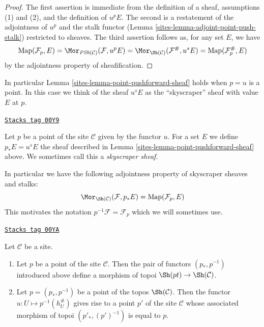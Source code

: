 \begin{proof}

The first assertion is immediate from the definition of a sheaf, assumptions
(1) and (2), and the definition of $u^pE$. The second is a restatement of the
adjointness of $u^p$ and the stalk functor
(Lemma \ref{sites-lemma-adjoint-point-push-stalk}) restricted to sheaves.
The third assertion follows as, for any set $E$, we have
$$
\text{Map}(\mathcal{F}_p, E) =
\Mor_{\textit{PSh}(\mathcal{C})}(\mathcal{F}, u^pE) =
\Mor_{\Sh(\mathcal{C})}(\mathcal{F}^\#, u^sE) =
\text{Map}(\mathcal{F}^\#_p, E)
$$
by the adjointness property of sheafification.
\end{proof}

In particular Lemma \ref{sites-lemma-point-pushforward-sheaf}
holds when $p = u$ is a point. In this case we think of the
sheaf $u^sE$ as the ``skyscraper'' sheaf with value $E$ at $p$.

\begin{definition}
\label{sites-definition-pushforward-point}
\href{https://stacks.math.columbia.edu/tag/00Y9}{\texttt{Stacks tag 00Y9}}

Let $p$ be a point of the site $\mathcal{C}$ given by the functor $u$.
For a set $E$ we define $p_*E = u^sE$ the sheaf
described in Lemma \ref{sites-lemma-point-pushforward-sheaf} above.
We sometimes call this a {\it skyscraper sheaf}.
\end{definition}

In particular we have the following adjointness property
of skyscraper sheaves and stalks:
$$
\Mor_{\Sh(\mathcal{C})}(\mathcal{F}, p_*E)
=
\text{Map}(\mathcal{F}_p, E)
$$
This motivates the notation $p^{-1}\mathcal{F} = \mathcal{F}_p$
which we will sometimes use.

\begin{lemma}
\label{sites-lemma-point-site-topos}
\href{https://stacks.math.columbia.edu/tag/00YA}{\texttt{Stacks tag 00YA}}

Let $\mathcal{C}$ be a site.
\begin{enumerate}
\item Let $p$ be a point of the site $\mathcal{C}$.
Then the pair of functors $(p_*, p^{-1})$ introduced
above define a morphism of topoi
$\Sh(pt) \to \Sh(\mathcal{C})$.
\item Let $p = (p_*, p^{-1})$
be a point of the topos $\Sh(\mathcal{C})$.
Then the functor $u : U \mapsto p^{-1}(h_U^\#)$ gives
rise to a point $p'$ of the site $\mathcal{C}$
whose associated morphism of topoi $(p'_*, (p')^{-1})$
is equal to $p$.
\end{enumerate}
\end{lemma}

